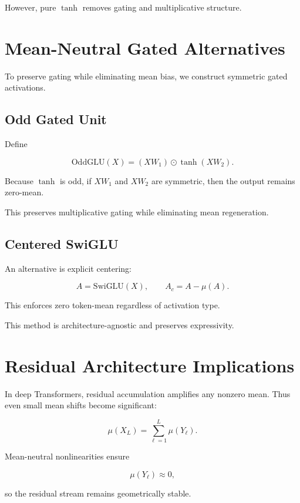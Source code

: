 However, pure $\tanh$ removes gating and multiplicative structure.

\section{Mean-Neutral Gated Alternatives}

To preserve gating while eliminating mean bias,
we construct symmetric gated activations.

\subsection{Odd Gated Unit}

Define

\begin{equation}
\text{OddGLU}(X)
=
(XW_1) \odot \tanh(XW_2).
\end{equation}

Because $\tanh$ is odd,
if $XW_1$ and $XW_2$ are symmetric,
then the output remains zero-mean.

This preserves multiplicative gating
while eliminating mean regeneration.

\subsection{Centered SwiGLU}

An alternative is explicit centering:

\begin{equation}
A = \text{SwiGLU}(X),
\qquad
A_c = A - \mu(A).
\end{equation}

This enforces zero token-mean regardless of activation type.

This method is architecture-agnostic and preserves expressivity.

\section{Residual Architecture Implications}

In deep Transformers, residual accumulation amplifies any nonzero mean.
Thus even small mean shifts become significant:

\[
\mu(X_L) = \sum_{\ell=1}^{L} \mu(Y_\ell).
\]

Mean-neutral nonlinearities ensure

\[
\mu(Y_\ell) \approx 0,
\]

so the residual stream remains geometrically stable.

